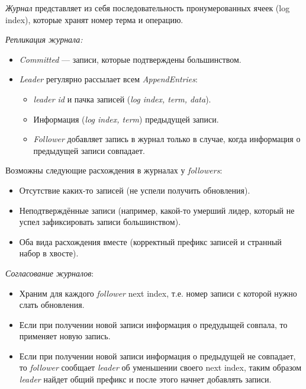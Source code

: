 \begin{definition}
    \textit{Журнал} представляет из себя последовательность пронумерованных
    ячеек (log index), которые хранят номер терма и операцию.
\end{definition}

\begin{algorithm} \textit{Репликация журнала:}
    \begin{itemize}
        \item \textit{Committed} --- записи, которые подтверждены большинством.
        \item \textit{Leader} регулярно рассылает всем \textit{AppendEntries}:
            \begin{itemize}
                \item \textit{leader id} и пачка записей (\textit{log index, term, data}).
                \item Информация (\textit{log index, term}) предыдущей записи.
                \item \textit{Follower} добавляет запись в журнал только в случае,
                    когда информация о предыдущей записи совпадает.
            \end{itemize}
    \end{itemize}
\end{algorithm}

\begin{remark}
    Возможны следующие расхождения в журналах у \textit{followers}:
    \begin{itemize}
        \item Отсутствие каких-то записей (не успели получить обновления).
        \item Неподтверждённые записи (например, какой-то умерший лидер,
            который не успел зафиксировать записи большинством).
        \item Оба вида расхождения вместе (корректный префикс записей и странный набор в хвосте).
    \end{itemize}
\end{remark}

\begin{algorithm} \textit{Согласование журналов}:
    \begin{itemize}
        \item Храним для каждого \textit{follower} next index, т.е. номер
            записи с которой нужно слать обновления.
        \item Если при получении новой записи информация о предудыщей совпала, то
             применяет новую запись.
        \item Если при получении новой записи информация о предыдущей не совпадает,
            то \textit{follower} сообщает \textit{leader} об уменьшении своего next index,
            таким образом \textit{leader} найдет общий префикс и после этого начнет добавлять записи.
    \end{itemize}
\end{algorithm}

